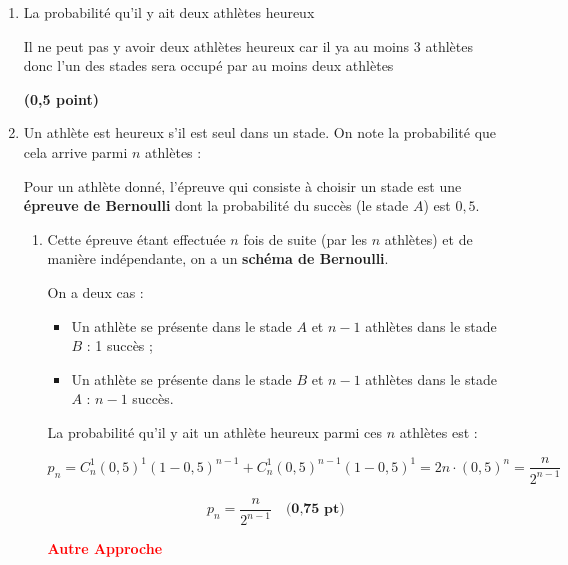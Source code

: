 \documentclass[12pt,a4paper]{article}
\begin{document}
\begin{enumerate}
    \item La probabilité qu’il y ait deux athlètes heureux

		Il ne peut pas y avoir deux athlètes heureux car il ya au moins 3 athlètes  donc l'un des stades sera occupé par au moins deux athlètes 
		
		\begin{center}
 				\fbox{\textcolor{red}{La probabilité qu'il y ait deux athlètes heureux est nulle}} \hfill \textbf{(0,5 point)}
		\end{center}
     
     \item Un athlète est heureux s’il est seul dans un stade. On note la probabilité que cela arrive parmi \( n \) athlètes :

\noindent
Pour un athlète donné, l’épreuve qui consiste à choisir un stade est une \textbf{épreuve de Bernoulli} dont la probabilité du succès (le stade \( A \)) est \( 0,5 \).\\

\begin{enumerate}
\item Cette épreuve étant effectuée \( n \) fois de suite (par les \( n \) athlètes) et de manière indépendante, on a un \textbf{schéma de Bernoulli}.

\vspace{0.2cm}
\noindent
On a deux cas :
\begin{itemize}
    \item[\textbullet] Un athlète se présente dans le stade \( A \) et \( n - 1 \) athlètes dans le stade \( B \) : 1 succès ;
    \item[\textbullet] Un athlète se présente dans le stade \( B \) et \( n - 1 \) athlètes dans le stade \( A \) : \( n - 1 \) succès.
\end{itemize}

\vspace{0.2cm}
\noindent
La probabilité qu’il y ait un athlète heureux parmi ces \( n \) athlètes est :

\[
p_n = C_n^1 (0{,}5)^1 (1 - 0{,}5)^{n - 1} + C_n^1 (0{,}5)^{n - 1}(1 - 0{,}5)^1 = 2n \cdot (0{,}5)^n = \frac{n}{2^{n - 1}}
\]

\vspace{0.2cm}
\[
\boxed{p_n = \dfrac{n}{2^{n - 1}}} \quad \textbf{(0,75 pt)}
\]


\textcolor{red}{\textbf{Autre Approche}}

    \vspace{0.4cm}
\noindent


\end{enumerate}
\end{enumerate}
\end{document}
